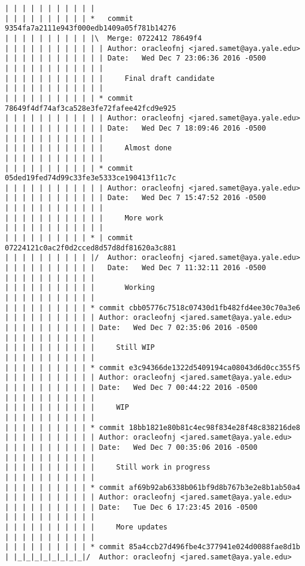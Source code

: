 \begin{lstlisting}
| | | | | | | | | | |              
| | | | | | | | | | *   commit 9354fa7a2111e943f000edb1409a05f781b14276
| | | | | | | | | | |\  Merge: 0722412 78649f4
| | | | | | | | | | | | Author: oracleofnj <jared.samet@aya.yale.edu>
| | | | | | | | | | | | Date:   Wed Dec 7 23:06:36 2016 -0500
| | | | | | | | | | | | 
| | | | | | | | | | | |     Final draft candidate
| | | | | | | | | | | |             
| | | | | | | | | | | * commit 78649f4df74af3ca528e3fe72fafee42fcd9e925
| | | | | | | | | | | | Author: oracleofnj <jared.samet@aya.yale.edu>
| | | | | | | | | | | | Date:   Wed Dec 7 18:09:46 2016 -0500
| | | | | | | | | | | | 
| | | | | | | | | | | |     Almost done
| | | | | | | | | | | |             
| | | | | | | | | | | * commit 05ded19fed74d99c33fe3e5333ce190413f11c7c
| | | | | | | | | | | | Author: oracleofnj <jared.samet@aya.yale.edu>
| | | | | | | | | | | | Date:   Wed Dec 7 15:47:52 2016 -0500
| | | | | | | | | | | | 
| | | | | | | | | | | |     More work
| | | | | | | | | | | |             
| | | | | | | | | | * | commit 07224121c0ac2f0d2cced8d57d8df81620a3c881
| | | | | | | | | | |/  Author: oracleofnj <jared.samet@aya.yale.edu>
| | | | | | | | | | |   Date:   Wed Dec 7 11:32:11 2016 -0500
| | | | | | | | | | |   
| | | | | | | | | | |       Working
| | | | | | | | | | |            
| | | | | | | | | | * commit cbb05776c7518c07430d1fb482fd4ee30c70a3e6
| | | | | | | | | | | Author: oracleofnj <jared.samet@aya.yale.edu>
| | | | | | | | | | | Date:   Wed Dec 7 02:35:06 2016 -0500
| | | | | | | | | | | 
| | | | | | | | | | |     Still WIP
| | | | | | | | | | |            
| | | | | | | | | | * commit e3c94366de1322d5409194ca08043d6d0cc355f5
| | | | | | | | | | | Author: oracleofnj <jared.samet@aya.yale.edu>
| | | | | | | | | | | Date:   Wed Dec 7 00:44:22 2016 -0500
| | | | | | | | | | | 
| | | | | | | | | | |     WIP
| | | | | | | | | | |            
| | | | | | | | | | * commit 18bb1821e80b81c4ec98f834e28f48c838216de8
| | | | | | | | | | | Author: oracleofnj <jared.samet@aya.yale.edu>
| | | | | | | | | | | Date:   Wed Dec 7 00:35:06 2016 -0500
| | | | | | | | | | | 
| | | | | | | | | | |     Still work in progress
| | | | | | | | | | |            
| | | | | | | | | | * commit af69b92ab6338b061bf9d8b767b3e2e8b1ab50a4
| | | | | | | | | | | Author: oracleofnj <jared.samet@aya.yale.edu>
| | | | | | | | | | | Date:   Tue Dec 6 17:23:45 2016 -0500
| | | | | | | | | | | 
| | | | | | | | | | |     More updates
| | | | | | | | | | |            
| | | | | | | | | | * commit 85a4ccb27d496fbe4c377941e024d0088fae8d1b
| |_|_|_|_|_|_|_|_|/  Author: oracleofnj <jared.samet@aya.yale.edu>

\end{lstlisting}
